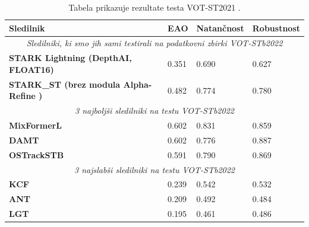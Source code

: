 \documentclass[a4paper,12pt,openright]{book}
\begin{document}
\begin{table}[htb]
    \begin{tabular}{p{}|p{}|p{}|p{}}    %
        {\bf Sledilnik }                                                          & {\bf \scriptsize EAO} & {\bf \scriptsize Natančnost} & {\bf \scriptsize Robustnost} \\
        \hline
        \multicolumn{4}{c}{\footnotesize \emph{Sledilniki, ki smo jih sami testirali na podatkovni zbirki VOT-STb2022 \cite{vot2022}}}                                  \\
        \hline
        \bf \scriptsize STARK Lightning \tiny (DepthAI, FLOAT16)                  & 0.351                 & 0.690                        & 0.627                        \\
        \bf \scriptsize STARK\_ST \tiny(brez modula Alpha-Refine \cite{alpharef}) & 0.482                 & 0.774                        & 0.780                        \\
        \hline
        \multicolumn{4}{c}{\footnotesize \emph{3 najboljši sledilniki na testu VOT-STb2022 \cite{vot2022}}}                                                             \\
        \hline
        \bf \scriptsize MixFormerL                                                & 0.602                 & 0.831                        & 0.859                        \\
        \bf \scriptsize DAMT                                                      & 0.602                 & 0.776                        & 0.887                        \\
        \bf \scriptsize OSTrackSTB                                                & 0.591                 & 0.790                        & 0.869                        \\
        \hline
        \multicolumn{4}{c}{\footnotesize \emph{3 najslabši sledilniki na testu VOT-STb2022 \cite{vot2022}}}                                                             \\
        \hline
        \bf \scriptsize KCF                                                       & 0.239                 & 0.542                        & 0.532                        \\
        \bf \scriptsize ANT                                                       & 0.209                 & 0.492                        & 0.484                        \\
        \bf \scriptsize LGT                                                       & 0.195                 & 0.461                        & 0.486                        \\
    \end{tabular}
    \caption{Tabela prikazuje rezultate testa VOT-ST2021 \cite{vot2021}.}
    \label{tab:vot2022_res}
\end{table}
\end{document}
